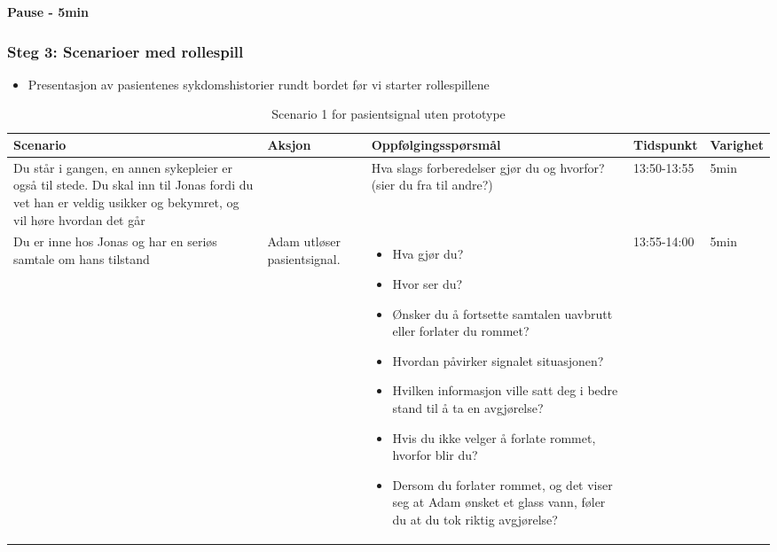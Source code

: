 \textbf{Pause - 5min}
\pagebreak
\subsubsection{Steg 3: Scenarioer med rollespill}



\begin{itemize}
\item Presentasjon av pasientenes sykdomshistorier rundt bordet før vi starter rollespillene
\end{itemize}

\begin{table}[H]
\small
\caption{Scenario 1 for pasientsignal uten prototype}
\begin{tabular}{p{3cm}|p{2cm}|p{4cm}|l|l}
\hline
\textbf{Scenario} & \textbf{Aksjon} & \textbf{Oppfølgingsspørsmål} & \textbf{Tidspunkt} & \textbf{Varighet}\\
\hline
Du står i gangen, en annen sykepleier er også til stede. Du skal inn til Jonas fordi du vet han er veldig usikker og bekymret, og vil høre hvordan det går & & Hva slags forberedelser gjør du og hvorfor? (sier du fra til andre?)
& 13:50-13:55 & 5min\\
\hline
Du er inne hos Jonas og har en seriøs samtale om hans tilstand & Adam utløser pasientsignal. & 
\begin{itemize}
\item Hva gjør du?
\item Hvor ser du?
\item Ønsker du å fortsette samtalen uavbrutt eller forlater du rommet?
\item Hvordan påvirker signalet situasjonen?
\item Hvilken informasjon ville satt deg i bedre stand til å ta en avgjørelse?
\item Hvis du ikke velger å forlate rommet, hvorfor blir du?
\item Dersom du forlater rommet, og det viser seg at Adam ønsket et glass vann, føler du at du tok riktig avgjørelse?
\end{itemize}
 & 13:55-14:00 & 5min\\
\end{tabular}
\label{Steg3.1}
\end{table}


